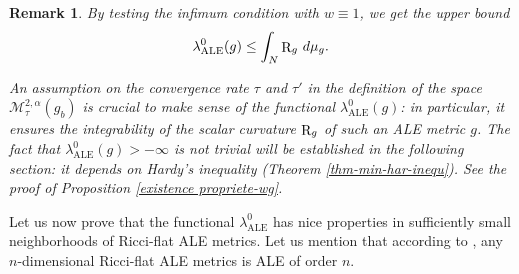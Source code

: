\documentclass[a4paper,11pt,reqno]{amsart}
\newtheorem{rk}[defn]{Remark}
\def\R{\mathop{\rm R}\nolimits}
\numberwithin{equation}{section}
\begin{document}
	\begin{rk}
		By testing the infimum condition with $w \equiv 1$, we get the upper bound 
		\begin{equation}
		\lambda_{\operatorname{ALE}}^0(g)\leq \int_N\R_g\,d\mu_g.\label{borne sup lambda ALE}
		\end{equation}
		
		An assumption on the convergence rate $\tau$ and $\tau'$ in the definition of the space $\mathcal{M}^{2,\alpha}_{\tau}(g_b)$ is crucial to make sense of the functional $\lambda_{\operatorname{ALE}}^0(g)$: in particular, it ensures the integrability of the scalar curvature $\R_g$ of such an ALE metric $g$. The fact that $\lambda_{\operatorname{ALE}}^0(g)>-\infty$ is not trivial will be established in the following section: it depends on Hardy's inequality (Theorem \ref{thm-min-har-inequ}). See the proof of Proposition \ref{existence propriete-wg}.
	\end{rk}
	
	
	
	Let us now prove that the functional $\lambda_{\operatorname{ALE}}^0$ has nice properties in sufficiently small neighborhoods of Ricci-flat ALE metrics. Let us mention that according to \cite{Ban-Kas-Nak,Che-Tian-Ric-Fla}, any $n$-dimensional Ricci-flat ALE metrics is ALE of order $n$.
	
	
	
\end{document}
